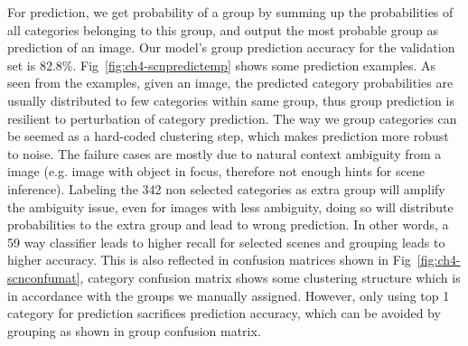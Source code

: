 For prediction, we get probability of a group by summing up the probabilities of all categories belonging to this group, and output the most probable group as prediction of an image. Our model's group prediction accuracy for the validation set is 82.8\%. Fig~\ref{fig:ch4-scnpredictemp} shows some prediction examples. As seen from the examples, given an image, the predicted category probabilities are usually distributed to few categories within same group, thus group prediction is resilient to perturbation of category prediction. The way we group categories can be seemed as a hard-coded clustering step, which makes prediction more robust to noise. The failure cases are mostly due to natural context ambiguity from a image (e.g. image with object in focus, therefore not enough hints for scene inference). Labeling the 342 non selected categories as extra group will amplify the ambiguity issue, even for images with less ambiguity, doing so will distribute probabilities to the extra group and lead to wrong prediction. In other words, a 59 way classifier leads to higher recall for selected scenes and grouping leads to higher accuracy. This is also reflected in confusion matrices shown in Fig~\ref{fig:ch4-scnconfumat}, category confusion matrix shows some clustering structure which is in accordance with the groups we manually assigned. However, only using top 1 category for prediction sacrifices prediction accuracy, which can be avoided by grouping as shown in group confusion matrix.

